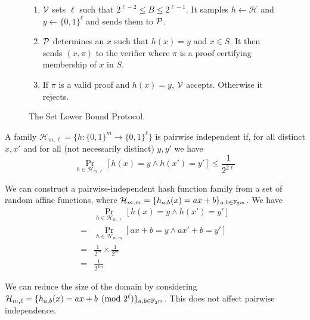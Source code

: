 \begin{figure}[h]
	\begin{mdframed}[
		linecolor=black,
		linewidth=1pt,
		roundcorner=5pt,
		backgroundcolor=white,
		userdefinedwidth=\textwidth,
		]
		\vspace{2mm}
		\begin{enumerate}
			\item $\mathcal{V}$ sets $\ell$ such that $2^{\ell-2}\leq B\leq 2^{\ell-1}$. It samples $h\leftarrow\mathcal{H}$ and $y\leftarrow\{0,1\}^\ell$ and sends them to $\mathcal{P}$.
			\item $\mathcal{P}$ determines an $x$ such that $h(x)=y$ and $x\in S$. It then sends $(x,\pi)$ to the verifier where $\pi$ is a proof certifying membership of $x$ in $S$.
			\item If $\pi$ is a valid proof and $h(x)=y$, $\mathcal{V}$ accepts. Otherwise it rejects. 
		\end{enumerate}
		\vspace{2mm}
	\end{mdframed}
	\caption{The Set Lower Bound Protocol.}
	\label{fig:5}
\end{figure}


\begin{definition}
	A family $\mathcal{H}_{m,\ell}=\{h:\{0,1\}^m\rightarrow\{0,1\}^\ell\}$ is pairwise independent if, for all distinct $x,x'$ and for all (not necessarily distinct) $y,y'$ we have
	$$\Pr_{h\in\mathcal{H}_{m,\ell}}[h(x)=y\wedge h(x')=y']\leq\frac{1}{2^{2\ell}}$$
\end{definition}

We can construct a pairwise-independent hash function family from a set of random affine functions, where $\mathcal{H}_{m,m}=\{h_{a,b}(x)=ax+b\}_{a,b\in\mathbb{F}_{2^m}}$. We have
\begin{align*}
	 &\Pr_{h\in\mathcal{H}_{m,\ell}}[h(x)=y\wedge h(x')=y']\\	=&\Pr_{h\in\mathcal{H}_{m,m}}[ax+b=y\wedge ax'+b=y']\\
	=&\frac{1}{2^m}\times\frac{1}{2^m}\\
	=&\frac{1}{2^{2m}}
\end{align*}

We can reduce the size of the domain by considering $\mathcal{H}_{m,\ell}=\{h_{a,b}(x)=ax+b\pmod{2^\ell}\}_{a,b\in\mathbb{F}_{2^m}}$. This does not affect pairwise independence.

\vspace{4mm}

